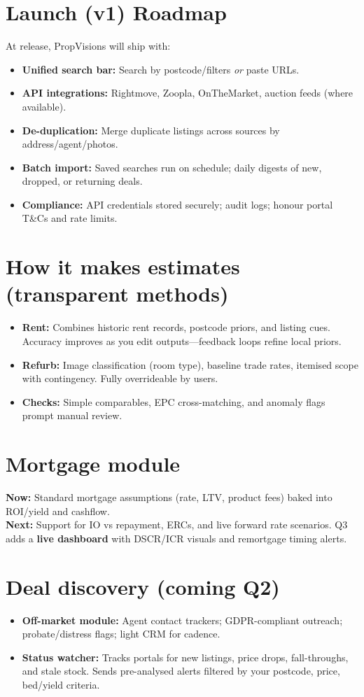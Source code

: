 \documentclass[11pt,a4paper]{article}
\newcommand{\product}{PropVisions}
\begin{document}
\section*{Launch (v1) Roadmap}
At release, \product{} will ship with:
\begin{itemize}
  \item \textbf{Unified search bar:} Search by postcode/filters \emph{or} paste URLs.
  \item \textbf{API integrations:} Rightmove, Zoopla, OnTheMarket, auction feeds (where available).
  \item \textbf{De-duplication:} Merge duplicate listings across sources by address/agent/photos.
  \item \textbf{Batch import:} Saved searches run on schedule; daily digests of new, dropped, or returning deals.
  \item \textbf{Compliance:} API credentials stored securely; audit logs; honour portal T\&Cs and rate limits.
\end{itemize}

\section*{How it makes estimates (transparent methods)}
\begin{itemize}
  \item \textbf{Rent:} Combines historic rent records, postcode priors, and listing cues. Accuracy improves as you edit outputs---feedback loops refine local priors.
  \item \textbf{Refurb:} Image classification (room type), baseline trade rates, itemised scope with contingency. Fully overrideable by users.
  \item \textbf{Checks:} Simple comparables, EPC cross-matching, and anomaly flags prompt manual review.
\end{itemize}

\section*{Mortgage module}
\textbf{Now:} Standard mortgage assumptions (rate, LTV, product fees) baked into ROI/yield and cashflow.\\
\textbf{Next:} Support for IO vs repayment, ERCs, and live forward rate scenarios. Q3 adds a \textbf{live dashboard} with DSCR/ICR visuals and remortgage timing alerts.

\section*{Deal discovery (coming Q2)}
\begin{itemize}
  \item \textbf{Off-market module:} Agent contact trackers; GDPR-compliant outreach; probate/distress flags; light CRM for cadence.
  \item \textbf{Status watcher:} Tracks portals for new listings, price drops, fall-throughs, and stale stock. Sends pre-analysed alerts filtered by your postcode, price, bed/yield criteria.
\end{itemize}
\end{document}
